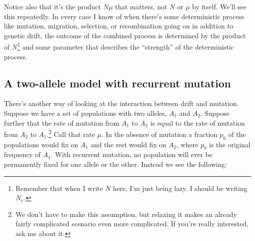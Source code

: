 \documentclass[12pt]{article}
\begin{document}
Notice also that it's the product $N\mu$ that matters, not $N$ or
$\mu$ by itself. We'll see this repeatedly. In every case I know of
when there's some deterministic process like mutation, migration,
selection, or recombination going on in addition to genetic drift, the
outcome of the combined process is determined by the product of
$N$\footnote{Remember that when I write $N$ here, I'm just being
  lazy. I should be writing $N_e$.} and some parameter that describes
the ``strength'' of the deterministic process.

\subsection*{A two-allele model with recurrent mutation}

There's another way of looking at the interaction between drift and
mutation. Suppose we have a set of populations with two alleles, $A_1$
and $A_2$. Suppose further that the rate of mutation from $A_1$ to
$A_2$ is equal to the rate of mutation from $A_2$ to
$A_1$.\footnote{We don't have to make this assumption, but relaxing it
  makes an already fairly complicated scenario even more
  complicated. If you're really interested, ask me about it.} Call
that rate $\mu$. In the absence of mutation a fraction $p_0$ of the
populations would fix on $A_1$ and the rest would fix on $A_2$, where
$p_0$ is the original frequency of $A_1$. With recurrent mutation, no
population will ever be permanently fixed for one allele or the
other. Instead we see the following:

\begin{center}
\end{center}
\end{document}
